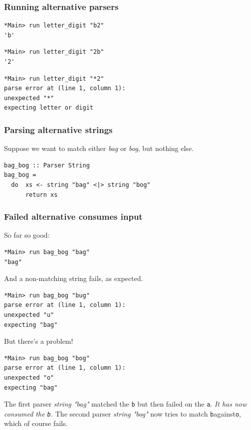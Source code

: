 \documentclass{beamer}
\begin{document}

\begin{frame}[fragile]
\frametitle{Running alternative parsers}

{\footnotesize
\begin{verbatim}
*Main> run letter_digit "b2"
'b'
\end{verbatim}
}

{\footnotesize
\begin{verbatim}
*Main> run letter_digit "2b"
'2'
\end{verbatim}
}

{\footnotesize
\begin{verbatim}
*Main> run letter_digit "*2"
parse error at (line 1, column 1):
unexpected "*"
expecting letter or digit
\end{verbatim}
}

\end{frame}

\begin{frame}[fragile]
\frametitle{Parsing alternative strings}

Suppose we want to match either \emph{bag} or \emph{bog}, but nothing else.

\begin{verbatim}
bag_bog :: Parser String
bag_bog =
  do  xs <- string "bag" <|> string "bog"
      return xs
   \end{verbatim}

\end{frame}

\begin{frame}[fragile]
\frametitle{Failed alternative consumes input}

So far so good:

{\footnotesize
\begin{verbatim}
*Main> run bag_bog "bag"
"bag"
\end{verbatim}
}

And a non-matching string fails, as expected.

{\footnotesize
\begin{verbatim}
*Main> run bag_bog "bug"
parse error at (line 1, column 1):
unexpected "u"
expecting "bag"
\end{verbatim}
}

But there's a problem!

{\footnotesize
\begin{verbatim}
*Main> run bag_bog "bog"
parse error at (line 1, column 1):
unexpected "o"
expecting "bag"
\end{verbatim}
}

The first parser \emph{string "bag"} matched the \texttt{b} but then failed on
the \texttt{a}.  \emph{It has now consumed the \texttt{b}.}  The second parser
\emph{string "bog"} now tries to match \texttt{b}against\texttt{o}, which of course
fails.

\end{frame}
\end{document}
